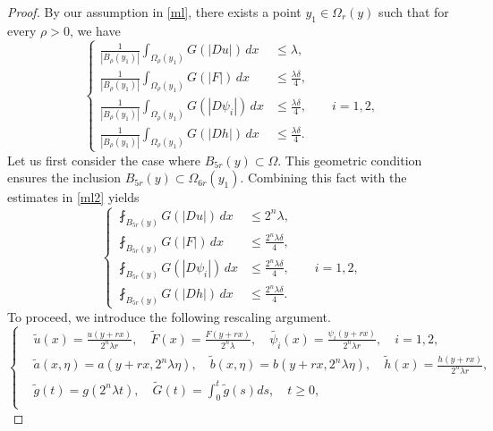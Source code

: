 \documentclass[10pt,a4paper]{article}
\theoremstyle{definition}
\numberwithin{equation}{section}
\begin{document}
 \begin{proof}
 	By our assumption in \eqref{ml}, there exists a point $y_1 \in \Omega_r(y)$ such that for every $\rho > 0$, we have
  \begin{equation}\label{ml2}
  	\left\{
  	\begin{aligned}
  		\frac{1}{|B_\rho(y_1)|}
  		\int_{\Omega_\rho(y_1)}G(|Du|)\,dx
  		&\leq \lambda, \\[0.15cm]
  		\frac{1}{|B_\rho(y_1)|}
  		\int_{\Omega_\rho(y_1)}G(|F|)\,dx
  		&\leq \frac{\lambda\delta}{4}, \\[0.15cm]
  		\frac{1}{|B_\rho(y_1)|}
  		\int_{\Omega_\rho(y_1)}G(|D\psi_i|)\,dx
  		&\leq \frac{\lambda\delta}{4},	\qquad i=1,2,  \\[0.15cm]
  		\frac{1}{|B_\rho(y_1)|}
  		\int_{\Omega_\rho(y_1)}G(|Dh|)\,dx
  		&\leq \frac{\lambda\delta}{4}.
  	\end{aligned}
  	\right.
  \end{equation}
 	Let us first consider the case where $B_{5r}(y) \subset \Omega$. This geometric condition ensures the inclusion $B_{5r}(y) \subset \Omega_{6r}(y_1)$. Combining this fact with the estimates in \eqref{ml2} yields
 	\begin{equation}\label{ml3}
 		\left\{
 		\begin{aligned}
 				\fint_{B_{5r}(y)} G(|Du|) \, dx  &\leq 2^n \lambda,  \\[0.15cm]
 		 \fint_{B_{5r}(y)} G(|F|) \, dx &\leq \frac{ 2^n \lambda \delta}{4}, \\[0.15cm]
 		  \fint_{B_{5r}(y)} G(|D\psi_i|) \, dx &\leq \frac{ 2^n \lambda \delta}{4},	\qquad i=1,2,  \\[0.15cm]
 		\fint_{B_{5r}(y)} G(|Dh|) \, dx &\leq \frac{ 2^n \lambda \delta}{4}.
 		\end{aligned}
 		\right.
 	\end{equation}
 	To proceed, we introduce the following rescaling argument.
 		\begin{equation*} 
 		\left\{
 		\begin{aligned}
 			 	&\tilde{u}(x) = \frac{u(y + rx)}{2^n \lambda r}, \quad \tilde{F}(x) = \frac{F(y + rx)}{2^n \lambda},  \quad \tilde{\psi_i}(x) = \frac{\psi_i(y + rx)}{2^n \lambda r}, \quad  i=1,2, \\[0.15cm]
 			 	&\tilde{a}(x,\eta) = a(y + rx,2^n \lambda \eta), \quad 	\tilde{b}(x,\eta) = b(y + rx,2^n \lambda \eta), \quad \tilde{h}(x) = \frac{h(y + rx)}{2^n \lambda r},   \\[0.15cm]
 		&\tilde{g}(t) = g(2^n \lambda t), \quad \tilde{G}(t) =\int_0^t \tilde{g}(s) ds, \quad t \geq 0, \\[0.15cm]

\end{aligned}
\end{equation*}
\end{proof}
\end{document}
